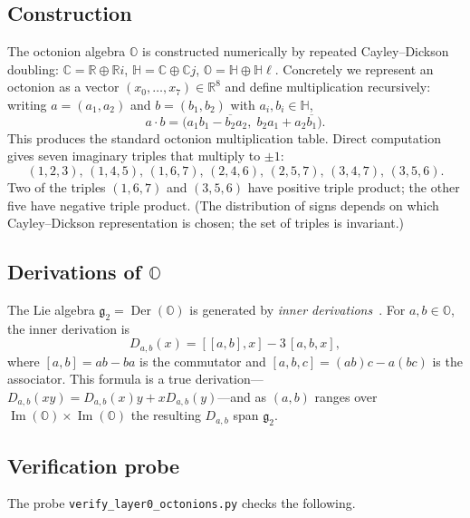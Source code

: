 \documentclass[11pt,a4paper]{article}
\theoremstyle{plain}
\theoremstyle{definition}
\theoremstyle{remark}
\numberwithin{equation}{section}
\providecommand{\HH}{\mathbb{H}}
\providecommand{\OO}{\mathbb{O}}
\providecommand{\RR}{\mathbb{R}}
\providecommand{\CC}{\mathbb{C}}
\DeclareMathOperator{\Der}{Der}
\DeclareMathOperator{\Img}{Im}
\begin{document}
\subsection{Construction}

The octonion algebra $\OO$ is constructed numerically by repeated
Cayley--Dickson doubling: $\CC = \RR \oplus \RR i$, $\HH = \CC
\oplus \CC j$, $\OO = \HH \oplus \HH\ell$.  Concretely we represent
an octonion as a vector $(x_0, \ldots, x_7) \in \RR^8$ and define
multiplication recursively: writing $a = (a_1, a_2)$ and
$b = (b_1, b_2)$ with $a_i, b_i \in \HH$,
\begin{equation}\label{eq:cd-octonion}
  a \cdot b = \bigl(a_1 b_1 - \overline{b_2} a_2,
                    \; b_2 a_1 + a_2 \overline{b_1}\bigr).
\end{equation}
This produces the standard octonion multiplication table.  Direct
computation gives seven imaginary triples that multiply to $\pm 1$:
\begin{equation}\label{eq:seven-triples}
  (1,2,3),\, (1,4,5),\, (1,6,7),\, (2,4,6),\, (2,5,7),\,
  (3,4,7),\, (3,5,6).
\end{equation}
Two of the triples $(1,6,7)$ and $(3,5,6)$ have positive triple
product; the other five have negative triple product.  (The
distribution of signs depends on which Cayley--Dickson
representation is chosen; the set of triples is invariant.)

\subsection{Derivations of $\OO$}

The Lie algebra $\mathfrak{g}_2 = \Der(\OO)$ is generated by
\emph{inner derivations}~\cite{schafer1966}.  For $a, b \in \OO$,
the inner derivation is
\begin{equation}\label{eq:inner-derivation}
  D_{a,b}(x) = [[a, b], x] - 3\,[a, b, x],
\end{equation}
where $[a, b] = ab - ba$ is the commutator and $[a, b, c] =
(ab)c - a(bc)$ is the associator.  This formula is a true
derivation---$D_{a,b}(xy) = D_{a,b}(x) y + x D_{a,b}(y)$---and as
$(a, b)$ ranges over $\Img(\OO) \times \Img(\OO)$ the resulting
$D_{a,b}$ span $\mathfrak{g}_2$.

\subsection{Verification probe}

The probe \texttt{verify\_layer0\_octonions.py} checks the
following.
\end{document}
